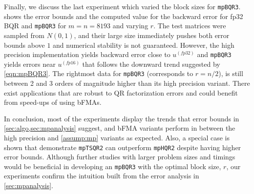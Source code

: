 \documentclass[review,onefignum,onetabnum]{siamart190516}
\begin{document}
Finally, we discuss the last experiment which varied the block sizes for {\tt mpBQR3}.
 shows the error bounds and the computed value for the backward error for fp32 BQR and {\tt mpBQR3} for $m=n=8193$ and varying $r$. 
The test matrices were sampled from $N(0,1)$, and their large size immediately pushes both error bounds above $1$ and numerical stability is not guaranteed.
However, the high precision implementation yields backward error close to $u^{(fp32)}$ and {\tt mpBQR3} yields errors near $u^{(fp16)}$ that follows the downward trend suggested by \cref{eqn:mpBQR3}.
The rightmost data for {\tt mpBQR3} (corresponds to $r=n/2$), is still between 2 and 3 orders of magnitude higher than its high precision variant. 
There exist applications that are robust to QR factorization errors and could benefit from speed-ups of using bFMAs.

In conclusion, most of the experiments display the trends that error bounds in \cref{sec:algo,sec:mpanalysis} suggest, and bFMA variants perform in between the high precision and \cref{assump:mp} variants as expected.
Also, a special case is shown that demonstrate {\tt mpTSQR2} can outperform {\tt mpHQR2} despite having higher error bounds.
Although further studies with larger problem sizes and timings would be beneficial in developing an {\tt mpBQR3} with the optimal block size, $r$, our experiments confirm the intuition built from the error analysis in \cref{sec:mpanalysis}.

%
%
%
%
%
\end{document}
